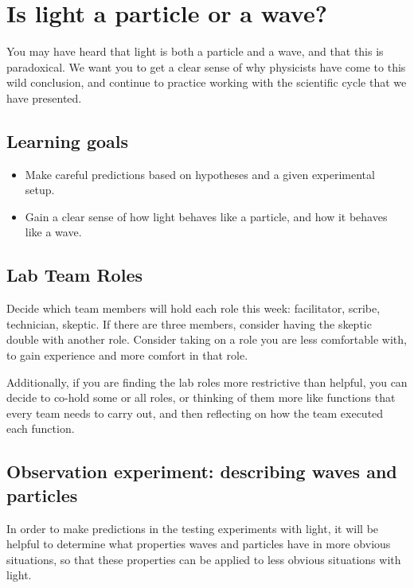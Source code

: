 \chapter{Is light a particle or a wave?}

You may have heard that light is both a particle and a wave, and that this is paradoxical. We want you to get a clear sense of why physicists have come to this wild conclusion, and continue to practice working with the scientific cycle that we have presented.

\section{Learning goals}

\begin{itemize}
	\item Make careful predictions based on hypotheses and a given experimental setup.
	
	\item Gain a clear sense of how light behaves like a particle, and how it behaves like a wave.
\end{itemize}

\section{Lab Team Roles}

Decide which team members will hold each role this week: facilitator, scribe, technician, skeptic. If there are three members, consider having the skeptic double with another role. Consider taking on a role you are less comfortable with, to gain experience and more comfort in that role.

Additionally, if you are finding the lab roles more restrictive than helpful, you can decide to co-hold some or all roles, or thinking of them more like functions that every team needs to carry out, and then reflecting on how the team executed each function.

\section{Observation experiment: describing waves and particles}

In order to make predictions in the testing experiments with light, it will be helpful to determine what properties waves and particles have in more obvious situations, so that these properties can be applied to less obvious situations with light.

